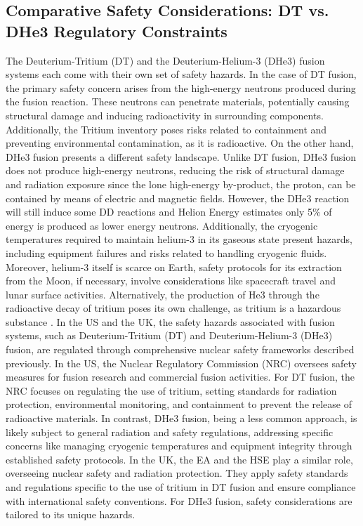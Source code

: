 \subsection{Comparative Safety Considerations: DT vs. DHe3 Regulatory Constraints}
The Deuterium-Tritium (DT) and the Deuterium-Helium-3 (DHe3) fusion systems each come with their own set of safety hazards. In the case of DT fusion, the primary safety concern arises from the high-energy neutrons produced during the fusion reaction. These neutrons can penetrate materials, potentially causing structural damage and inducing radioactivity in surrounding components. Additionally, the Tritium inventory poses risks related to containment and preventing environmental contamination, as it is radioactive. \cite{Kazimi_1984}
On the other hand, DHe3 fusion presents a different safety landscape. Unlike DT fusion, DHe3 fusion does not produce high-energy neutrons, reducing the risk of structural damage and radiation exposure since the lone high-energy by-product, the proton, can be contained by means of electric and magnetic fields. \cite{zucchetti2010advanced} However, the DHe3 reaction will still induce some DD reactions and Helion Energy estimates only 5\% of energy is produced as lower energy neutrons. \cite{NRC2021} Additionally, the cryogenic temperatures required to maintain helium-3 in its gaseous state present hazards, including equipment failures and risks related to handling cryogenic fluids. \cite{isoflex} Moreover, helium-3 itself is scarce on Earth, safety protocols for its extraction from the Moon, if necessary, involve considerations like spacecraft travel and lunar surface activities. \cite{santarius2004lunar} Alternatively, the production of He3 through the radioactive decay of tritium poses its own challenge, as tritium is a hazardous substance \cite{de2021helium}.
In the US and the UK, the safety hazards associated with fusion systems, such as Deuterium-Tritium (DT) and Deuterium-Helium-3 (DHe3) fusion, are regulated through comprehensive nuclear safety frameworks described previously. In the US, the Nuclear Regulatory Commission (NRC) oversees safety measures for fusion research and commercial fusion activities. For DT fusion, the NRC focuses on regulating the use of tritium, setting standards for radiation protection, environmental monitoring, and containment to prevent the release of radioactive materials. \cite{fusionindustryassociationDecisionSeparates} In contrast, DHe3 fusion, being a less common approach, is likely subject to general radiation and safety regulations, addressing specific concerns like managing cryogenic temperatures and equipment integrity through established safety protocols. 
In the UK, the EA and the HSE play a similar role, overseeing nuclear safety and radiation protection. They apply safety standards and regulations specific to the use of tritium in DT fusion and ensure compliance with international safety conventions. For DHe3 fusion, safety considerations are tailored to its unique hazards.
 
